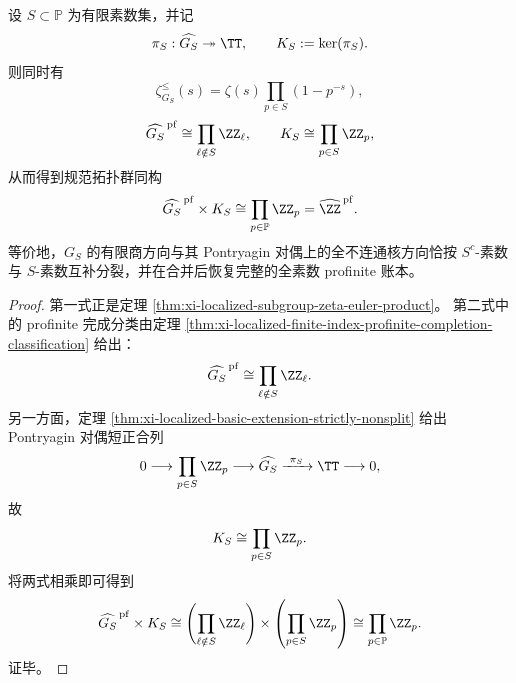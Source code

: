 \begin{theorem}\label{thm:xi-time-part56e-localized-subgroup-zeta-profinite-complement-splitting}
设 \(S\subset\mathbb P\) 为有限素数集，并记
\[
\pi_S:\widehat{G_S}\twoheadrightarrow \TT,
\qquad
K_S:=\ker(\pi_S).
\]
则同时有
\[
\zeta_{G_S}^{\le}(s)
=
\zeta(s)\prod_{p\in S}(1-p^{-s}),
\]
\[
\widehat{G_S}^{\,\mathrm{pf}}
\cong
\prod_{\ell\notin S}\ZZ_\ell,
\qquad
K_S
\cong
\prod_{p\in S}\ZZ_p,
\]
从而得到规范拓扑群同构
\[
\widehat{G_S}^{\,\mathrm{pf}}\times K_S
\cong
\prod_{p\in\mathbb P}\ZZ_p
=
\widehat{\ZZ}^{\,\mathrm{pf}}.
\]
等价地，\(G_S\) 的有限商方向与其 Pontryagin 对偶上的全不连通核方向恰按 \(S^c\)-素数与 \(S\)-素数互补分裂，并在合并后恢复完整的全素数 profinite 账本。
\end{theorem}
\begin{proof}
第一式正是定理 \ref{thm:xi-localized-subgroup-zeta-euler-product}。
第二式中的 profinite 完成分类由定理
\ref{thm:xi-localized-finite-index-profinite-completion-classification}
给出：
\[
\widehat{G_S}^{\,\mathrm{pf}}
\cong
\prod_{\ell\notin S}\ZZ_\ell.
\]
另一方面，定理 \ref{thm:xi-localized-basic-extension-strictly-nonsplit}
给出 Pontryagin 对偶短正合列
\[
0\longrightarrow \prod_{p\in S}\ZZ_p
\longrightarrow \widehat{G_S}
\xrightarrow{\ \pi_S\ }
\TT
\longrightarrow 0,
\]
故
\[
K_S\cong \prod_{p\in S}\ZZ_p.
\]
将两式相乘即可得到
\[
\widehat{G_S}^{\,\mathrm{pf}}\times K_S
\cong
\left(\prod_{\ell\notin S}\ZZ_\ell\right)\times
\left(\prod_{p\in S}\ZZ_p\right)
\cong
\prod_{p\in\mathbb P}\ZZ_p.
\]
证毕。
\end{proof}

\endinput
